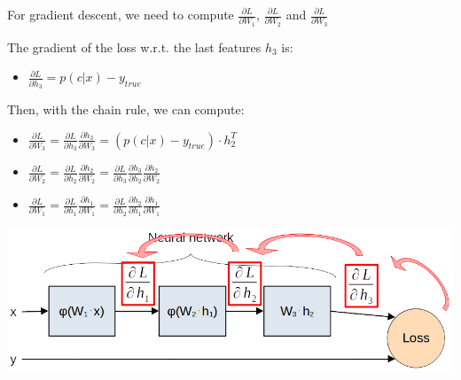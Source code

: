 \documentclass[usenames,dvipsnames]{beamer}
\begin{document}
    \begin{frame}{\secname}{\subsecname}
        \vspace{-1.5em}
	    \begin{exampleblock}{}
	        For gradient descent, we need to compute $\frac{\partial L}{\partial W_1}$, $\frac{\partial L}{\partial W_2}$ and $\frac{\partial L}{\partial W_3}$
	        
			The gradient of the loss w.r.t. the last features $h_3$ is:
			\begin{itemize}
			    \item $\frac{\partial L}{\partial h_3} = p(c|x) - y_{true}$
			\end{itemize}
			Then, with the chain rule, we can compute:
			\begin{itemize}
			    \item $\frac{\partial L}{\partial W_3} =\frac{\partial L}{\partial h_3}\frac{\partial h_3}{\partial W_3} = (p(c|x)-y_{true})\cdot h_2^T$
			    \item $\frac{\partial L}{\partial W_2} =\frac{\partial L}{\partial h_2}\frac{\partial h_2}{\partial W_2} = \frac{\partial L}{\partial h_3}\frac{\partial h_3}{\partial h_2}\frac{\partial h_2}{\partial W_2}$
			    \item $\frac{\partial L}{\partial W_1} =\frac{\partial L}{\partial h_1}\frac{\partial h_1}{\partial W_1} = \frac{\partial L}{\partial h_2}\frac{\partial h_2}{\partial h_1}\frac{\partial h_1}{\partial W_1}$
			\end{itemize}
			\begin{center}
				\includegraphics[width=0.7\linewidth]{figures/DL_fundamentals/backpropagation_mik_grad.png}
			\end{center}
			\vspace{-0.5em}
         \end{exampleblock}
    \end{frame}
\end{document}
